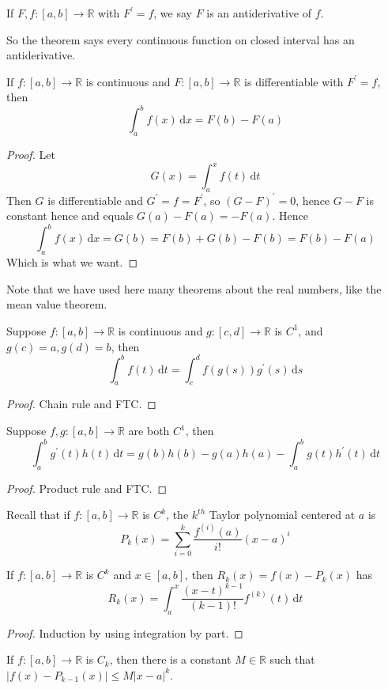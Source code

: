 \begin{definition}
    If $F,f:[a,b]\to\mathbb R$ with $F^\prime=f$, we say $F$ is an antiderivative of $f$.
\end{definition}
So the theorem says every continuous function on closed interval has an antiderivative.
\begin{theorem}
    If $f:[a,b]\to\mathbb R$ is continuous and $F:[a,b]\to\mathbb R$ is differentiable with $F^\prime=f$, then
    $$\int_a^bf(x)\,\mathrm dx=F(b)-F(a)$$
\end{theorem}
\begin{proof}
    Let
    $$G(x)=\int_a^xf(t)\,\mathrm dt$$
    Then $G$ is differentiable and $G^\prime=f=F^\prime$, so $(G-F)^\prime=0$, hence $G-F$ is constant hence and equals $G(a)-F(a)=-F(a)$.
    Hence
    $$\int_a^bf(x)\,\mathrm dx=G(b)=F(b)+G(b)-F(b)=F(b)-F(a)$$
    Which is what we want.
\end{proof}
Note that we have used here many theorems about the real numbers, like the mean value theorem.
\begin{corollary}
    Suppose $f:[a,b]\to\mathbb R$ is continuous and $g:[c,d]\to\mathbb R$ is $C^1$, and $g(c)=a, g(d)=b$, then
    $$\int_a^bf(t)\,\mathrm dt=\int_c^df(g(s))g^\prime(s)\,\mathrm ds$$
\end{corollary}
\begin{proof}
    Chain rule and FTC.
\end{proof}
\begin{corollary}
    Suppose $f,g:[a,b]\to\mathbb R$ are both $C^1$, then
    $$\int_a^bg^\prime(t)h(t)\,\mathrm dt=g(b)h(b)-g(a)h(a)-\int_a^bg(t)h^\prime(t)\,\mathrm dt$$
\end{corollary}
\begin{proof}
    Product rule and FTC.
\end{proof}
Recall that if $f:[a,b]\to\mathbb R$ is $C^k$, the $k^{th}$ Taylor polynomial centered at $a$ is
$$P_k(x)=\sum_{i=0}^k\frac{f^{(i)}(a)}{i!}(x-a)^i$$
\begin{theorem}
    If $f:[a,b]\to\mathbb R$ is $C^k$ and $x\in[a,b]$, then $R_k(x)=f(x)-P_k(x)$ has
    $$R_k(x)=\int_a^x\frac{(x-t)^{k-1}}{(k-1)!}f^{(k)}(t)\,\mathrm dt$$
\end{theorem}
\begin{proof}
    Induction by using integration by part.
\end{proof}
\begin{corollary}
    If $f:[a,b]\to\mathbb R$ is $C_k$, then there is a constant $M\in\mathbb R$ such that $|f(x)-P_{k-1}(x)|\le M|x-a|^k$.
\end{corollary}

